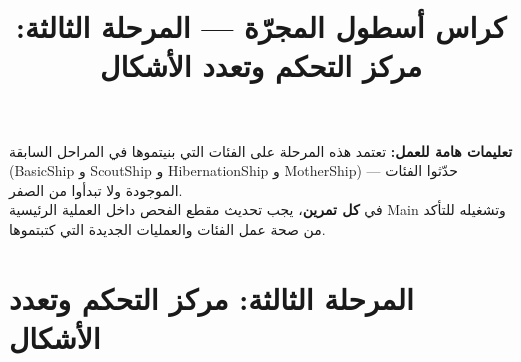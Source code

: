 \documentclass[14pt]{extarticle}
\title{كراس أسطول المجرّة — المرحلة الثالثة: مركز التحكم وتعدد الأشكال}
\begin{document}
\maketitle
\thispagestyle{fancy}

\begin{boxWarning}
\textbf{تعليمات هامة للعمل:}
تعتمد هذه المرحلة على الفئات التي بنيتموها في المراحل السابقة (\textenglish{BasicShip} و \textenglish{ScoutShip} و \textenglish{HibernationShip} و \textenglish{MotherShip}) — حدّثوا الفئات الموجودة ولا تبدأوا من الصفر. \\
في \textbf{كل تمرين}، يجب تحديث مقطع الفحص داخل العملية الرئيسية \textenglish{Main} وتشغيله للتأكد من صحة عمل الفئات والعمليات الجديدة التي كتبتموها.
\end{boxWarning}

\section*{المرحلة الثالثة: مركز التحكم وتعدد الأشكال}
\end{document}
